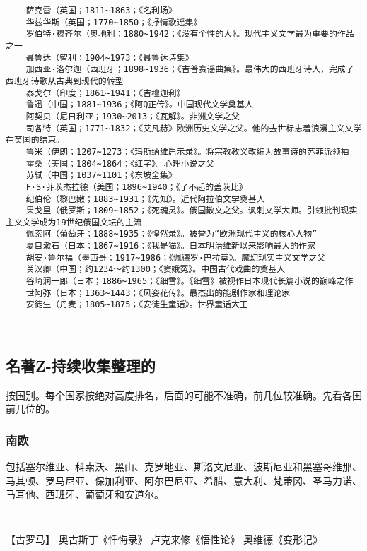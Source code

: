 \documentclass[UTF8]{../RepresentationUniverse}
\begin{document}
\begin{lstlisting}
    萨克雷（英国；1811~1863；《名利场》
    华兹华斯（英国；1770~1850；《抒情歌谣集》
    罗伯特·穆齐尔（奥地利；1880~1942；《没有个性的人》。现代主义文学最为重要的作品之一
    聂鲁达（智利；1904~1973；《聂鲁达诗集》
    加西亚·洛尔迦（西班牙；1898~1936；《吉普赛谣曲集》。最伟大的西班牙诗人，完成了西班牙诗歌从古典到现代的转型
    泰戈尔（印度；1861~1941；《吉檀迦利》
    鲁迅（中国；1881~1936；《阿Q正传》。中国现代文学奠基人
    阿契贝（尼日利亚；1930~2013；《瓦解》。非洲文学之父
    司各特（英国；1771~1832；《艾凡赫》欧洲历史文学之父。他的去世标志着浪漫主义文学在英国的结束。
    鲁米（伊朗；1207~1273；《玛斯纳维启示录》。将宗教教义改编为故事诗的苏菲派领袖
    霍桑（美国；1804~1864；《红字》。心理小说之父
    苏轼（中国；1037~1101；《东坡全集》
    F·S·菲茨杰拉德（美国；1896~1940；《了不起的盖茨比》
    纪伯伦（黎巴嫩；1883~1931；《先知》。近代阿拉伯文学奠基人
    果戈里（俄罗斯；1809~1852；《死魂灵》。俄国散文之父。讽刺文学大师。引领批判现实主义文学成为19世纪俄国文坛的主流
    佩索阿（葡萄牙；1888~1935；《惶然录》。被誉为“欧洲现代主义的核心人物”
    夏目漱石（日本；1867~1916；《我是猫》。日本明治维新以来影响最大的作家
    胡安·鲁尔福（墨西哥；1917~1986；《佩德罗·巴拉莫》。魔幻现实主义文学之父
    关汉卿（中国；约1234～约1300；《窦娥冤》。中国古代戏曲的奠基人
    谷崎润一郎（日本；1886~1965；《细雪》。《细雪》被视作日本现代长篇小说的巅峰之作
    世阿弥（日本；1363~1443；《风姿花传》。最杰出的能剧作家和理论家
    安徒生（丹麦；1805~1875；《安徒生童话》。世界童话大王

    
\end{lstlisting}



\subsection{名著Z-持续收集整理的}

按国别。每个国家按绝对高度排名，后面的可能不准确，前几位较准确。先看各国前几位的。

\subsubsection{南欧}
包括塞尔维亚、科索沃、黑山、克罗地亚、斯洛文尼亚、波斯尼亚和黑塞哥维那、马其顿、罗马尼亚、保加利亚、阿尔巴尼亚、希腊、意大利、梵蒂冈、圣马力诺、马耳他、西班牙、葡萄牙和安道尔。
\begin{lstlisting}
   
\end{lstlisting}
【古罗马】
奥古斯丁《忏悔录》
卢克来修《悟性论》
奥维德《变形记》
\end{document}
